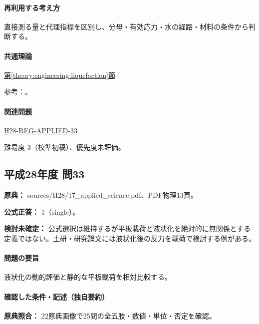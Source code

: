 \paragraph{再利用する考え方} 直接測る量と代理指標を区別し、分母・有効応力・水の経路・材料の条件から判断する。

\paragraph{共通理論} \hyperref[theory:engineering:liquefaction]{第\ref*{theory:engineering:liquefaction}節}

\par 参考：\cite{eng52_liquefaction,eng52_plate_liq,geebec_ps}。

\paragraph{関連問題} \hyperref[q:h28-reg-applied-33]{H28-REG-APPLIED-33}

\par 難易度 3（校準初稿）、優先度未評価。

\subsection{平成28年度 問33}
\label{q:h28-reg-applied-33}

\noindent\textbf{原典：} sources/H28/17\_applied\_science.pdf、PDF物理13頁。

\textbf{公式正答：} 1（single）。

\par\textbf{検討未確定：} 公式選択は維持するが平板載荷と液状化を絶対的に無関係とする定義ではない。土研・研究論文には液状化後の反力を載荷で検討する例がある。

\paragraph{問題の要旨} 液状化の動的評価と静的な平板載荷を相対比較する。

\paragraph{確認した条件・記述（独自要約）}\mbox{}\par

\noindent\textbf{原典照合：} 22原典画像で25問の全五肢・数値・単位・否定を確認。\par

